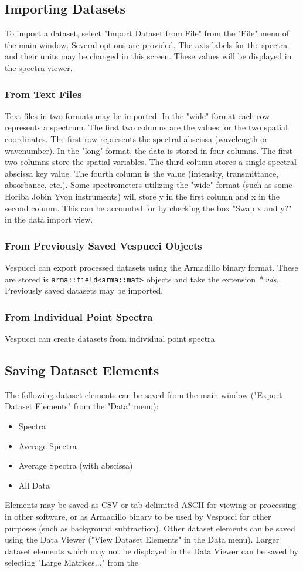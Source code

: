 \documentclass[12pt]{achemso} %
\begin{document}
\subsection{Importing Datasets} To import a dataset, select "Import Dataset from
File" from the "File" menu of the main window. Several options are provided. The
axis labels for the spectra and their units may be changed in this screen. These
values will be displayed in the spectra viewer.

\subsubsection{From Text Files} Text files in two formats may be imported. In
the "wide" format each row represents a spectrum. The first two columns are the
values for the two spatial coordinates. The first row represents the spectral
abscissa (wavelength or wavenumber). In the "long" format, the data is stored in
four columns. The first two columns store the spatial variables. The third
column stores a single spectral abscissa key value. The fourth column is the
value (intensity, transmittance, absorbance, etc.). Some spectrometers utilizing
the "wide" format (such as some Horiba Jobin Yvon instruments) will store y in
the first column and x in the second column. This can be accounted for by
checking the box "Swap x and y?" in the data import view.

\subsubsection{From Previously Saved Vespucci Objects} Vespucci can export
processed datasets using the Armadillo binary format. These are stored is
\texttt{arma::field<arma::mat>} objects and take the extension \emph{*.vds}.
Previously saved datasets may be imported.

\subsubsection{From Individual Point Spectra} Vespucci can create datasets from
individual point spectra

\subsection{Saving Dataset Elements} The following dataset elements can be saved
from the main window ("Export Dataset Elements" from the "Data" menu):
\begin{itemize} \item Spectra \item Average Spectra \item Average Spectra (with
abscissa) \item All Data \end{itemize} Elements may be saved as CSV or
tab-delimited ASCII for viewing or processing in other software, or as Armadillo
binary to be used by Vespucci for other purposes (such as background
subtraction). Other dataset elements can be saved using the Data Viewer ("View
Dataset Elements" in the Data menu). Larger dataset elements which may not be
displayed in the Data Viewer can be saved by selecting "Large Matrices..." from
the
\end{document}
